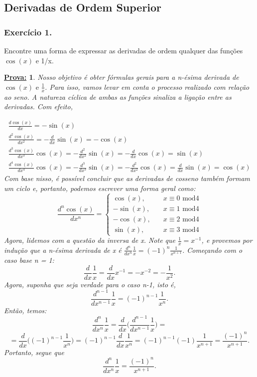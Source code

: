 \documentclass{article}
\newtheorem*{proof*}{\underline{Prova:}}
\begin{document}
\subsection[Derivadas de Ordem Superior]{Derivadas de Ordem Superior}
\subsubsection{Exerc\'icio 1.}
Encontre uma forma de expressar as derivadas de ordem qualquer das fun\c c\~oes $\cos
	(x)$ e 1/x.

\begin{proof*}
	Nosso objetivo \'e obter f\'ormulas gerais para a n-\'esima derivada de $\cos(x
		) \text{ e }\frac{1}{x}$. Para isso, vamos levar em conta o processo realizado
	com rela\c c\~ao ao seno. A natureza c\'iclica de ambas as fun\c c\~oes
	sinaliza a liga\c c\~ao entre as derivadas. Com efeito,

	\[
		\begin{array}{ll}
			\frac{d \cos(x)}{d x} = -\sin(x)                                                                    \\
			\frac{d^{2}\cos(x)}{d x^{2}} = -\frac{d}{dx}\sin(x) = -\cos(x)                                      \\
			\frac{d^{3}\cos(x)}{d x^{3}}\cos(x) = -\frac{d^{2}}{dx^{2}}\sin(x) = -\frac{d}{dx}\cos(x) = \sin(x) \\
			\frac{d^{4}\cos(x)}{d x^{4}}\cos(x) = -\frac{d^{3}}{dx^{3}}\sin(x) = -\frac{d^{2}}{dx^{2}}\cos(x) = \frac{d}{dx}\sin(x) = \cos(x)
		\end{array}
	\]
	Com base nisso, \'e poss\'ivel concluir que as derivadas de cosseno tamb\'em
	formam um ciclo e, portanto, podemos escrever uma forma geral como:
	\[
		\frac{d^{n}\cos(x)}{d x^{n}}= \left\{
		\begin{array}{ll}
			\cos(x),  & \quad x\equiv 0\text{ mod}4 \\
			-\sin(x), & \quad x\equiv 1\text{ mod}4 \\
			-\cos(x), & \quad x\equiv 2\text{ mod}4 \\
			\sin(x),  & \quad x\equiv 3\text{ mod}4
		\end{array}
		\right.
	\]
	Agora, lidemos com a quest\~ao da inversa de x. Note que $\frac{1}{x}= x^{-1}$,
	e provemos por indu\c c\~ao que a n-\'esima derivada de x \'e $\frac{d^{n}}{d
			x^{n}}\frac{1}{x}= (-1)^{n}\frac{1}{x^{n+1}}$. Come\c cando com o caso base n =
	1:
	\[
		\frac{d}{dx}\frac{1}{x}= \frac{d}{dx}x^{-1}= -x^{-2}= -\frac{1}{x^{2}}.
	\]
	Agora, suponha que seja verdade para o caso n-1, isto \'e,
	\[
		\frac{d^{n-1}}{d x^{n-1}}\frac{1}{x}= (-1)^{n-1}\frac{1}{x^{n}}.
	\]
	Ent\~ao, temos:
	\[
		\frac{d^{n}}{d x^{n}}\frac{1}{x}= \frac{d}{dx}\biggl(\frac{d^{n-1}}{d x^{n-1}}\frac{1}{x}\biggr) =
	\]
	\[
		=\frac{d}{dx}\biggl((-1)^{n-1}\frac{1}{x^{n}}\biggr) = (-1)^{n-1}\frac{d}{dx}\frac{1}{x^{n}}= (-1)^{n-1}(-1)\frac{1}{x^{n+1}}= \frac{(-1)^{n}}{x^{n+1}}.
	\]
	Portanto, segue que
	\[
		\frac{d^{n}}{d x^{n}}\frac{1}{x}= \frac{(-1)^{n}}{x^{n+1}}.
	\]
\end{proof*}
\end{document}
